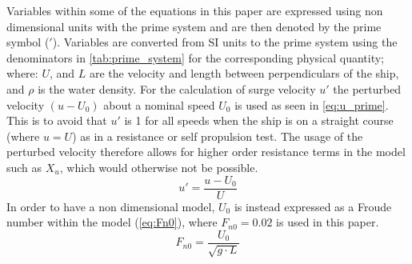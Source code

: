 Variables within some of the equations in this paper are expressed using non dimensional units with the prime system and are then denoted by the prime symbol ($'$). Variables are converted from SI units to the prime system using the denominators in \autoref{tab:prime_system} for the corresponding physical quantity; where: $U$, and $L$ are the velocity and length between perpendiculars of the ship, and $\rho$ is the water density.
For the calculation of surge velocity $u'$ the perturbed velocity $(u-U_0)$ about a nominal speed $U_0$ is used as seen in \autoref{eq:u_prime}. This is to avoid that $u'$ is 1 for all speeds when the ship is on a straight course (where $u=U$) as in a resistance or self propulsion test. The usage of the perturbed velocity therefore allows for higher order resistance terms in the model such as $X_{u}$, which would otherwise not be possible. 
\begin{equation}
    \label{eq:u_prime}
    u' = \frac{u-U_0}{U}
\end{equation}
In order to have a non dimensional model, $U_0$ is instead expressed as a Froude number within the model (\autoref{eq:Fn0}), where $F_{n0}=0.02$ is used in this paper.
\begin{equation}
    \label{eq:Fn0}
    F_{n0} = \frac{U_0}{\sqrt{g \cdot L}}
\end{equation}